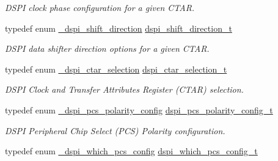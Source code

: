 \begin{DoxyCompactItemize}
\begin{DoxyCompactList}\small\item\em D\+S\+PI clock phase configuration for a given C\+T\+AR. \end{DoxyCompactList}\item 
typedef enum \hyperlink{group__dspi__hal_gaf1134e11fc318e82a6c15882fdab2760}{\+\_\+dspi\+\_\+shift\+\_\+direction} \hyperlink{group__dspi__hal_ga536388ab9d8d1b88f7d112a83b769366}{dspi\+\_\+shift\+\_\+direction\+\_\+t}\hypertarget{group__dspi__hal_ga536388ab9d8d1b88f7d112a83b769366}{}\label{group__dspi__hal_ga536388ab9d8d1b88f7d112a83b769366}

\begin{DoxyCompactList}\small\item\em D\+S\+PI data shifter direction options for a given C\+T\+AR. \end{DoxyCompactList}\item 
typedef enum \hyperlink{group__dspi__hal_ga78060c4222b1affc8e41f937909ee999}{\+\_\+dspi\+\_\+ctar\+\_\+selection} \hyperlink{group__dspi__hal_ga8d2c04fe9fd119bdcc613f4c35095721}{dspi\+\_\+ctar\+\_\+selection\+\_\+t}\hypertarget{group__dspi__hal_ga8d2c04fe9fd119bdcc613f4c35095721}{}\label{group__dspi__hal_ga8d2c04fe9fd119bdcc613f4c35095721}

\begin{DoxyCompactList}\small\item\em D\+S\+PI Clock and Transfer Attributes Register (C\+T\+AR) selection. \end{DoxyCompactList}\item 
typedef enum \hyperlink{group__dspi__hal_ga1b2a1103a54ad51c35f2bdaa52ac7363}{\+\_\+dspi\+\_\+pcs\+\_\+polarity\+\_\+config} \hyperlink{group__dspi__hal_ga8e5abd30c155a0fa6cc651a6535e8aee}{dspi\+\_\+pcs\+\_\+polarity\+\_\+config\+\_\+t}\hypertarget{group__dspi__hal_ga8e5abd30c155a0fa6cc651a6535e8aee}{}\label{group__dspi__hal_ga8e5abd30c155a0fa6cc651a6535e8aee}

\begin{DoxyCompactList}\small\item\em D\+S\+PI Peripheral Chip Select (P\+CS) Polarity configuration. \end{DoxyCompactList}\item 
typedef enum \hyperlink{group__dspi__hal_ga738d1c33c04047440e86e29fabbbba94}{\+\_\+dspi\+\_\+which\+\_\+pcs\+\_\+config} \hyperlink{group__dspi__hal_ga5377cd155b68bf00351fff6e58230062}{dspi\+\_\+which\+\_\+pcs\+\_\+config\+\_\+t}\hypertarget{group__dspi__hal_ga5377cd155b68bf00351fff6e58230062}{}\label{group__dspi__hal_ga5377cd155b68bf00351fff6e58230062}


\end{DoxyCompactItemize}
